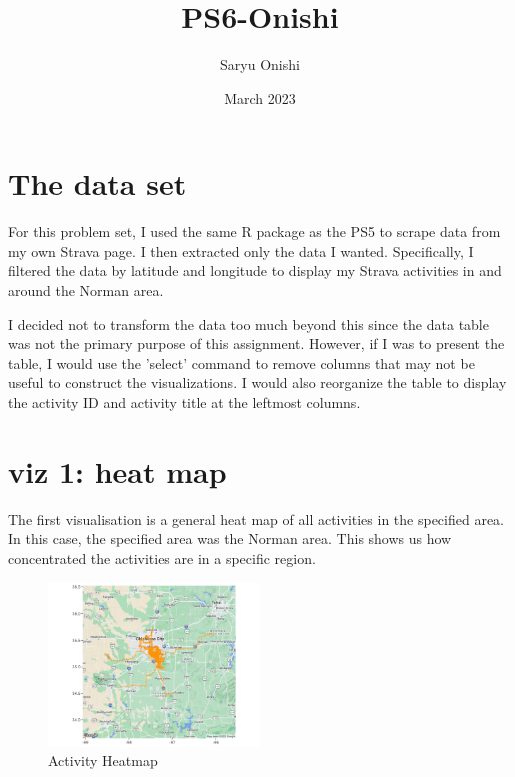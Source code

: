 \documentclass{article}
\title{PS6-Onishi}
\author{Saryu Onishi}
\date{March 2023}
\begin{document}
\maketitle
\section{The data set}
For this problem set, I used the same R package as the PS5 to scrape data from my own Strava page. I then extracted only the data I wanted. Specifically, I filtered the data by latitude and longitude to display my Strava activities in and around the Norman area.

I decided not to transform the data too much beyond this since the data table was not the primary purpose of this assignment. However, if I was to present the table, I would use the 'select' command to remove columns that may not be useful to construct the visualizations. I would also reorganize the table to display the activity ID and activity title at the leftmost columns.

\section{viz 1: heat map}
The first visualisation is a general heat map of all activities in the specified area. In this case, the specified area was the Norman area. 
This shows us how concentrated the activities are in a specific region.
\begin{figure}[h]
\centering
\includegraphics[width=0.5\textwidth]{PS6a_Onishi.png}
\caption{Activity Heatmap}
\end{figure}
\end{document}
